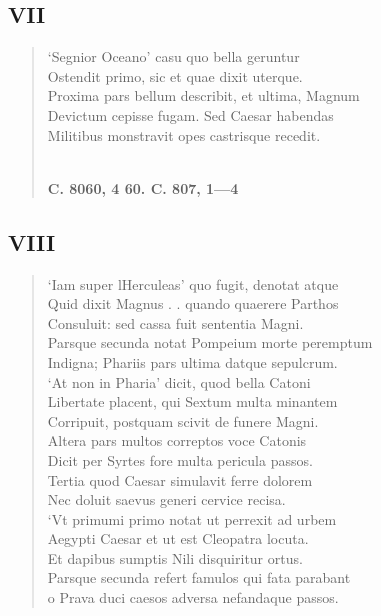 \documentclass[11pt, a4paper]{report}
\begin{document}
            \subsection*{VII}
      \begin{verse}
      ‘Segnior Oceano’ casu quo bella geruntur \\ Ostendit primo, sic et quae dixit uterque. \\ Proxima pars bellum describit, et ultima, Magnum \\ Devictum cepisse fugam. Sed Caesar habendas \\ Militibus monstravit opes castrisque recedit. \\ 
        ﻿\pagebreak 
    \begin{center} \textbf{C. 8060, 4 60. C. 807, 1—4} \end{center} \marginpar{[281]} 
      \end{verse}
  
            \subsection*{VIII}
      \begin{verse}
      ‘Iam super lHerculeas’ quo fugit, denotat atque \\ Quid dixit  \lbrack Magnus . . quando quaerere Parthos \\ Consuluit: sed cassa fuit sententia Magni. \\ Parsque secunda notat Pompeium morte peremptum \\ Indigna; Phariis pars ultima datque sepulcrum. \\ ‘At non in Pharia’ dicit, quod bella Catoni \\ Libertate placent, qui Sextum multa minantem \\ Corripuit, postquam scivit de funere Magni. \\ Altera pars multos correptos voce Catonis \\ Dicit per Syrtes fore multa pericula passos. \\ Tertia quod Caesar simulavit ferre dolorem \\ Nec doluit saevus generi cervice recisa. \\ ‘Vt primumi primo notat ut perrexit ad urbem \\ Aegypti Caesar et ut est Cleopatra locuta. \\ Et dapibus sumptis Nili disquiritur ortus. \\ Parsque secunda refert famulos qui fata parabant \\ o Prava duci caesos adversa nefandaque passos. \\ 
      \end{verse}
  
\end{document}
